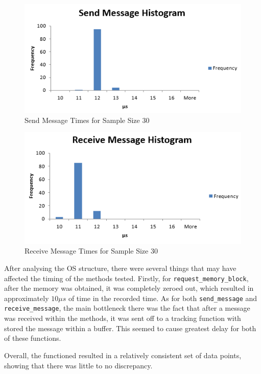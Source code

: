 \documentclass[se]{uw-wkrpt}
\begin{document}
\begin{figure}[bp!]
\centering
\includegraphics[width=120mm]{SendMessageHistogram.png}
\caption{Send Message Times for Sample Size 30}
\label{fig:send}
\end{figure}

\begin{figure}[bp!]
\centering
\includegraphics[width=120mm]{ReceiveMessageHistogram.png}
\caption{Receive Message Times for Sample Size 30}
\label{fig:receive}
\end{figure}

After analysing the OS structure, there were several things that may have affected the timing of the methods tested. Firstly, for \texttt{request\_memory\_block}, after the memory was obtained, it was completely zeroed out, which resulted in approximately $10\mu s$ of time in the recorded time. As for both \texttt{send\_message} and \texttt{receive\_message}, the main bottleneck there was the fact that after a message was received within the methods, it was sent off to a tracking function with stored the message within a buffer. This seemed to cause greatest delay for both of these functions.

Overall, the functioned resulted in a relatively consistent set of data points, showing that there was little to no discrepancy.
\end{document}
